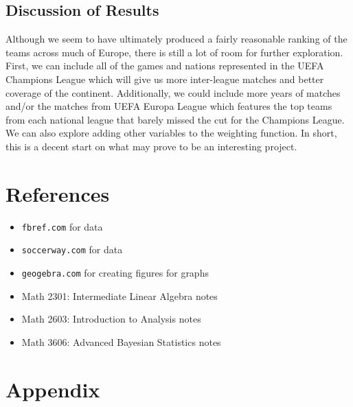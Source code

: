 \documentclass[10pt]{article}
\begin{document}
\subsection{Discussion of Results}
Although we seem to have ultimately produced a fairly reasonable ranking of the teams across much of Europe, there is still a lot of room for further exploration. First, we can include all of the games and nations represented in the UEFA Champions League which will give us more inter-league matches and better coverage of the continent. Additionally, we could include more years of matches and/or the matches from UEFA Europa League which features the top teams from each national league that barely missed the cut for the Champions League. We can also explore adding other variables to the weighting function. In short, this is a decent start on what may prove to be an interesting project.
\newpage
\section{References}
\begin{itemize}
    \item \texttt{fbref.com} for data
    \item \texttt{soccerway.com} for data
    \item \texttt{geogebra.com} for creating figures for graphs
    \item Math 2301: Intermediate Linear Algebra notes
    \item Math 2603: Introduction to Analysis notes
    \item Math 3606: Advanced Bayesian Statistics notes
\end{itemize}
\newpage
\section{Appendix}
\end{document}
